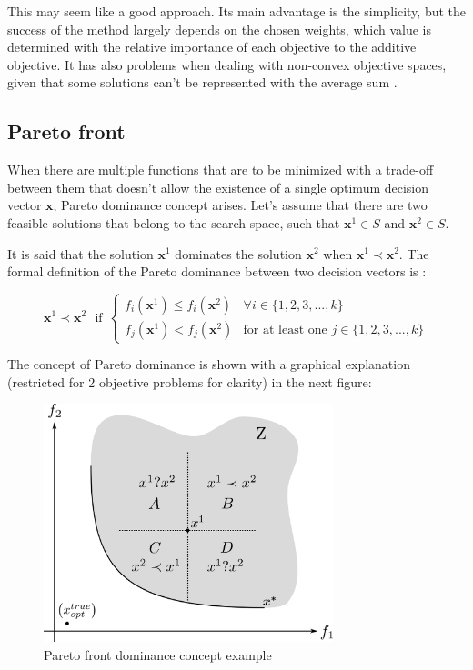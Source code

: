     
    This may seem like a good approach. Its main advantage is the simplicity, but the success of the method largely depends on the chosen weights, which value is determined with the relative importance of each objective to the additive objective. It has also problems when dealing with non-convex objective spaces, given that some solutions can't be represented with the average sum \cite{jakob2014pareto} \cite{fonseca1995overview}.

\subsection{Pareto front}

    When there are multiple functions that are to be minimized with a trade-off between them that doesn't allow the existence of a single optimum decision vector $\bm{x}$, Pareto dominance concept arises. Let's assume that there are two feasible solutions that belong to the search space, such that $\bm{x}^1\in S$ and $\bm{x}^2\in S$. 
    
    \newpage
    
    It is said that the solution $\bm{x}^1$ dominates the solution $\bm{x}^2$ when $\bm{x}^1 \prec \bm{x}^2$. The formal definition of the Pareto dominance between two decision vectors is \cite{collette2013multiobjective}:
    
    \begin{equation}
        \bm{x}^1 \prec \bm{x}^2\ \ \ \textrm{if} \ \ \left\{
        \begin{array}{rl}
            f_i(\bm{x}^1) \leq f_i(\bm{x}^2)&  \forall i \in \{1,2,3,...,k\}\\
            f_j(\bm{x}^1) < f_j(\bm{x}^2) & \textrm{for at least one } j \in \{1,2,3,...,k\} 
        \end{array} \right.
        \label{eq:ParetoDominance}
    \end{equation}
    
    The concept of Pareto dominance is shown with a graphical explanation (restricted for 2 objective problems for clarity) in the next figure:
    
    \begin{figure}[h!]
        \centering
        \includegraphics[width=0.75\textwidth]{Figures/2/paretoFront4cuad.png}
        \caption{Pareto front dominance concept example}
        \label{fig:4cuad}
    \end{figure}
    
